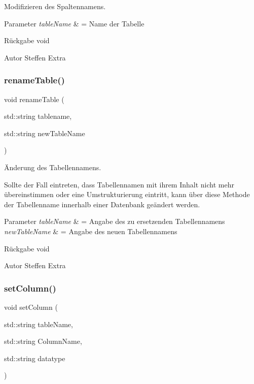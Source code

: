 Modifizieren des Spaltennamens. 


\begin{DoxyParams}{Parameter}
{\em table\+Name} & = Name der Tabelle\\
\hline
\end{DoxyParams}
\begin{DoxyReturn}{Rückgabe}
void
\end{DoxyReturn}
\begin{DoxyAuthor}{Autor}
Steffen Extra 
\end{DoxyAuthor}
\mbox{\label{tables_8hpp_a526b049a888b2a4a1332a10540689afd}} 
\subsubsection{rename\+Table()}
{\footnotesize\ttfamily void rename\+Table (\begin{DoxyParamCaption}\item[{std\+::string}]{tablename,  }\item[{std\+::string}]{new\+Table\+Name }\end{DoxyParamCaption})}



Änderung des Tabellennamens. 

Sollte der Fall eintreten, dass Tabellennamen mit ihrem Inhalt nicht mehr übereinstimmen oder eine Umstrukturierung eintritt, kann über diese Methode der Tabellenname innerhalb einer Datenbank geändert werden.


\begin{DoxyParams}{Parameter}
{\em table\+Name} & = Angabe des zu ersetzenden Tabellennamens \\
\hline
{\em new\+Table\+Name} & = Angabe des neuen Tabellennamens\\
\hline
\end{DoxyParams}
\begin{DoxyReturn}{Rückgabe}
void
\end{DoxyReturn}
\begin{DoxyAuthor}{Autor}
Steffen Extra 
\end{DoxyAuthor}
\mbox{\label{tables_8hpp_a7c4575b6ed6eb203c2796930c41ed555}} 
\subsubsection{set\+Column()}
{\footnotesize\ttfamily void set\+Column (\begin{DoxyParamCaption}\item[{std\+::string}]{table\+Name,  }\item[{std\+::string}]{Column\+Name,  }\item[{std\+::string}]{datatype }\end{DoxyParamCaption})}




